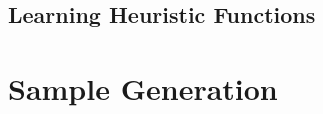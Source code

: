 \documentclass[ppgc,diss,english]{iiufrgs}
\begin{document}
\section{Learning Heuristic Functions}



%
%
\chapter{Sample Generation}
\end{document}
